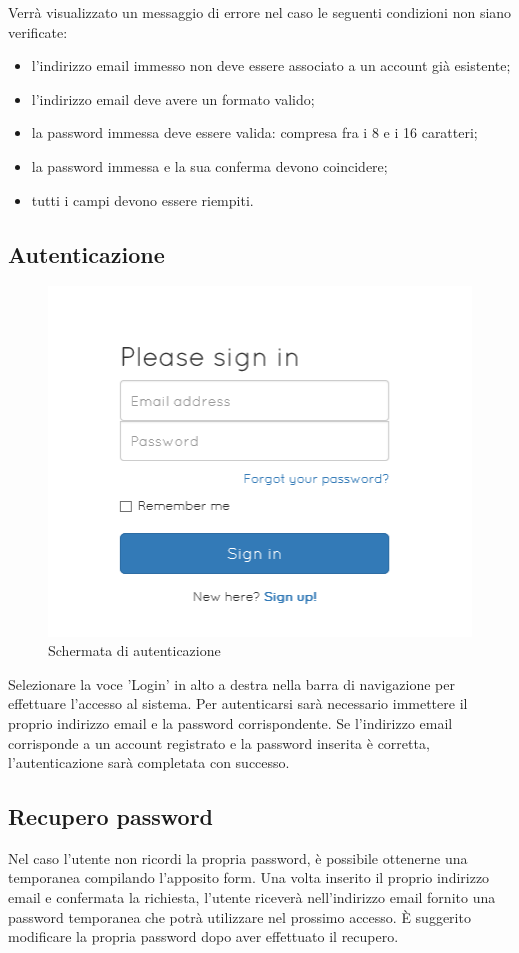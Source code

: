 \documentclass[a4paper, titlepage]{article}
\begin{document}
	Verrà visualizzato un messaggio di errore nel caso le seguenti condizioni non siano verificate:
	\begin{itemize}
		\item l'indirizzo email immesso non deve essere associato a un account già esistente;
		\item l'indirizzo email deve avere un formato valido;
		\item la password immessa deve essere valida: compresa fra i 8 e i 16 caratteri;
		\item la password immessa e la sua conferma devono coincidere;
		\item tutti i campi devono essere riempiti.
	\end{itemize}
	
	\subsection{Autenticazione}
	\begin{figure}[!h]
		\centering
		\includegraphics[scale=1]{Img/login.png}
		\caption{Schermata di autenticazione}
	\end{figure}
	Selezionare la voce 'Login' in alto a destra nella barra di navigazione per effettuare l'accesso al sistema. Per autenticarsi sarà necessario immettere il proprio indirizzo email e la password corrispondente. Se l'indirizzo email corrisponde a un account registrato e la password inserita è corretta, l'autenticazione sarà completata con successo.

	\subsection{Recupero password}
	Nel caso l'utente non ricordi la propria password, è possibile ottenerne una temporanea compilando l'apposito form. Una volta inserito il proprio indirizzo email e confermata la richiesta, l'utente riceverà nell'indirizzo email fornito una password temporanea che potrà utilizzare nel prossimo accesso. È suggerito modificare la propria password dopo aver effettuato il recupero.
	
\end{document}
